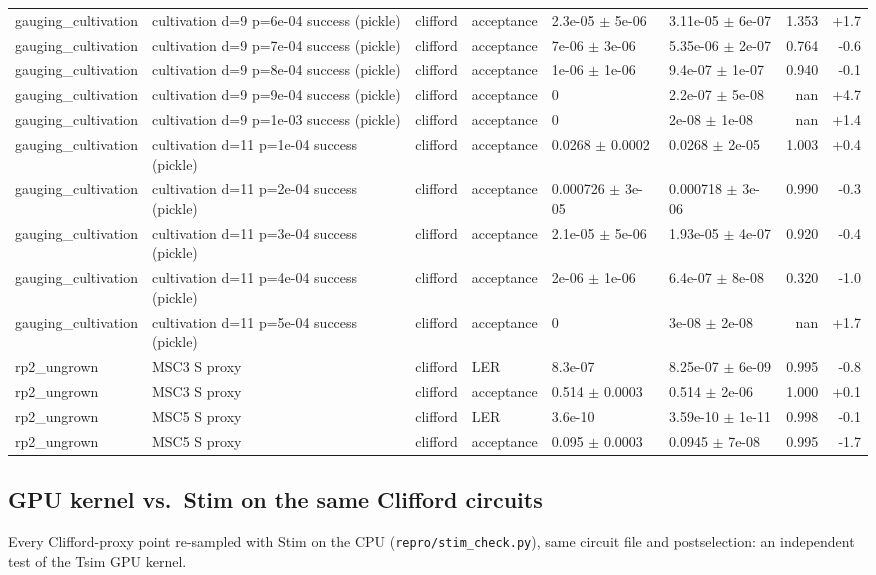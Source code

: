 \documentclass[10pt]{article}
\begin{document}
{\begin{longtable}{l l l l l l r r}
gauging\_cultivation & cultivation d=9 p=6e-04 success (pickle) & clifford & acceptance & 2.3e-05 $\pm$ 5e-06 & 3.11e-05 $\pm$ 6e-07 & 1.353 & +1.7 \\
gauging\_cultivation & cultivation d=9 p=7e-04 success (pickle) & clifford & acceptance & 7e-06 $\pm$ 3e-06 & 5.35e-06 $\pm$ 2e-07 & 0.764 & -0.6 \\
gauging\_cultivation & cultivation d=9 p=8e-04 success (pickle) & clifford & acceptance & 1e-06 $\pm$ 1e-06 & 9.4e-07 $\pm$ 1e-07 & 0.940 & -0.1 \\
gauging\_cultivation & cultivation d=9 p=9e-04 success (pickle) & clifford & acceptance & 0 & 2.2e-07 $\pm$ 5e-08 & nan & +4.7 \\
gauging\_cultivation & cultivation d=9 p=1e-03 success (pickle) & clifford & acceptance & 0 & 2e-08 $\pm$ 1e-08 & nan & +1.4 \\
gauging\_cultivation & cultivation d=11 p=1e-04 success (pickle) & clifford & acceptance & 0.0268 $\pm$ 0.0002 & 0.0268 $\pm$ 2e-05 & 1.003 & +0.4 \\
gauging\_cultivation & cultivation d=11 p=2e-04 success (pickle) & clifford & acceptance & 0.000726 $\pm$ 3e-05 & 0.000718 $\pm$ 3e-06 & 0.990 & -0.3 \\
gauging\_cultivation & cultivation d=11 p=3e-04 success (pickle) & clifford & acceptance & 2.1e-05 $\pm$ 5e-06 & 1.93e-05 $\pm$ 4e-07 & 0.920 & -0.4 \\
gauging\_cultivation & cultivation d=11 p=4e-04 success (pickle) & clifford & acceptance & 2e-06 $\pm$ 1e-06 & 6.4e-07 $\pm$ 8e-08 & 0.320 & -1.0 \\
gauging\_cultivation & cultivation d=11 p=5e-04 success (pickle) & clifford & acceptance & 0 & 3e-08 $\pm$ 2e-08 & nan & +1.7 \\
rp2\_ungrown & MSC3 S proxy & clifford & LER & 8.3e-07 & 8.25e-07 $\pm$ 6e-09 & 0.995 & -0.8 \\
rp2\_ungrown & MSC3 S proxy & clifford & acceptance & 0.514 $\pm$ 0.0003 & 0.514 $\pm$ 2e-06 & 1.000 & +0.1 \\
rp2\_ungrown & MSC5 S proxy & clifford & LER & 3.6e-10 & 3.59e-10 $\pm$ 1e-11 & 0.998 & -0.1 \\
rp2\_ungrown & MSC5 S proxy & clifford & acceptance & 0.095 $\pm$ 0.0003 & 0.0945 $\pm$ 7e-08 & 0.995 & -1.7 \\
\bottomrule
\end{longtable}}
\subsection*{GPU kernel vs.\ Stim on the same Clifford circuits}
Every Clifford-proxy point re-sampled with Stim on the CPU (\texttt{repro/stim\_check.py}), same circuit file and postselection: an independent test of the Tsim GPU kernel.
\end{document}
